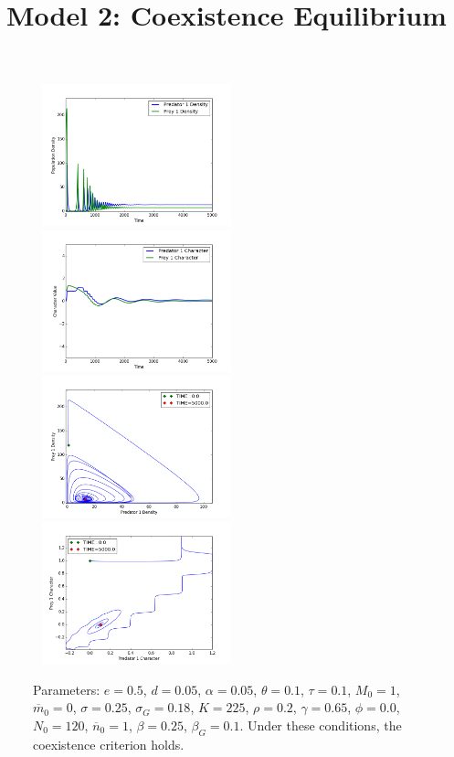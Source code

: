 \documentclass{amsart}
\theoremstyle{definition}
\theoremstyle{remark}
\numberwithin{equation}{section}
\begin{document}
\begin{centering}
\begin{figure}
		\label{fig:variable_growth_exclusion}
	\end{figure}
	\begin{figure}
		\title{\bf Model 2: Coexistence Equilibrium\\}
		\includegraphics[width=6cm,height=4.1cm]{figures/1x1/variable_growth/stable_coexistence/densities.png}
		\includegraphics[width=6cm,height=4.1cm]{figures/1x1/variable_growth/stable_coexistence/traits.png}
		\includegraphics[width=6cm,height=4.1cm]{figures/1x1/variable_growth/stable_coexistence/density_phase_plane.png}
		\includegraphics[width=6cm,height=4.1cm]{figures/1x1/variable_growth/stable_coexistence/trait_phase_plane.png}
		\caption{\footnotesize Parameters: $e = 0.5$, $d = 0.05$, $\alpha = 0.05$, $\theta = 0.1$, $\tau = 0.1$, $M_0 = 1$, $\overline{m}_0 = 0$, $\sigma = 0.25$, $\sigma_G = 0.18$, $K = 225$, $\rho = 0.2$, $\gamma = 0.65$, $\phi = 0.0$, $N_0 = 120$, $\overline{n}_0 = 1$, $\beta = 0.25$, $\beta_G = 0.1$.  Under these conditions, the coexistence criterion holds.}

\end{figure}
\end{centering}
\end{document}
